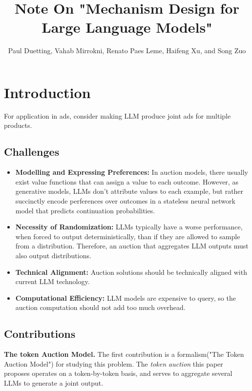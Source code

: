 \documentclass{article}
\title{Note On "Mechanism Design for Large Language Models"}
\author{Paul Duetting, Vahab Mirrokni, Renato Paes Leme, Haifeng Xu, and Song Zuo}
\begin{document}
\maketitle

\section{Introduction}

For application in ads, consider making LLM produce joint ads for multiple products.

\subsection*{Challenges}

\begin{itemize}
    \item \textbf{Modelling and Expressing Preferences:} In auction models, there usually exist value functions 
    that can assign a value to each outcome. However, as generative models, LLMs don't attribute values to each
    example, but rather succinctly encode perferences over outcomes in a stateless neural network model that predicts
    continuation probabilities.
    \item \textbf{Necessity of Randomization:} LLMs typically have a worse performance, when forced to output deterministically,
    than if they are allowed to sample from a distribution. Therefore, an auction that aggregates LLM outputs 
    must also output distributions.
    \item \textbf{Technical Alignment:} Auction solutions should be technically aligned with current LLM technology.
    \item \textbf{Computational Efficiency:} LLM models are expensive to query, so the auction computation should not add too much overhead.
    
\end{itemize}


\subsection*{Contributions}

\textbf{The token Auction Model.} The first contribution is a formalism("The Token Auction Model") for studying this 
problem. The \textit{token auction} this paper proposes operates on a token-by-token basis, and serves to aggregate several LLMs to generate a joint output.
\end{document}
